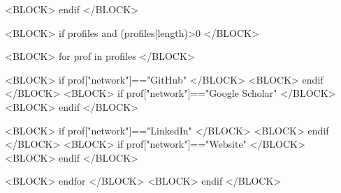 
<BLOCK> endif </BLOCK>






<BLOCK> if profiles and (profiles|length)>0 </BLOCK>

<BLOCK> for prof in profiles </BLOCK>

  <BLOCK> if prof["network"]=="GitHub" </BLOCK>
  <BLOCK> endif </BLOCK>
  <BLOCK> if prof["network"]=="Google Scholar" </BLOCK>
  <BLOCK> endif </BLOCK>

  <BLOCK> if prof["network"]=="LinkedIn" </BLOCK>
  <BLOCK> endif </BLOCK>
    <BLOCK> if prof["network"]=="Website" </BLOCK>
  <BLOCK> endif </BLOCK>


<BLOCK> endfor </BLOCK>
<BLOCK> endif </BLOCK>


%
%
%
%








